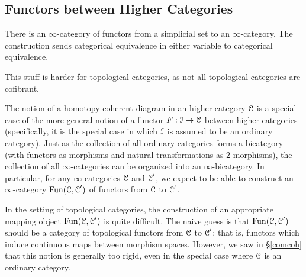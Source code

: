 \subsection{Functors between Higher Categories}\label{funcback}
\begin{1.2.7 Functors between higher cats}
\begin{shaded}
There is an $\infty$-category of functors from a simplicial set to an $\infty$-category. The construction sends categorical equivalence in either variable to categorical equivalence.

This stuff is harder for topological categories, as not all topological categories are cofibrant.
\end{shaded}
The notion of a homotopy coherent diagram in an higher category
$\operatorname{\mathcal{C}}$ is a special case of the more general notion of a functor
$F: \operatorname{\mathcal{I}} \rightarrow \operatorname{\mathcal{C}}$ between higher categories
(specifically, it is the special case in which $\operatorname{\mathcal{I}}$ is assumed
to be an ordinary category). Just as the collection of all
ordinary categories forms a bicategory (with functors as
morphisms and natural transformations as $2$-morphisms), the
collection of all $\infty$-categories can
be organized into an $\infty$-bicategory. In particular, for any
$\infty$-categories $\operatorname{\mathcal{C}}$ and $\operatorname{\mathcal{C}}'$, we expect to be able to construct
an $\infty$-category $\operatorname{Fun}(\operatorname{\mathcal{C}},\operatorname{\mathcal{C}}')$ of functors from $\operatorname{\mathcal{C}}$ to
$\operatorname{\mathcal{C}}'$.

In the setting of topological categories, the construction of an appropriate mapping object $\operatorname{Fun}(\operatorname{\mathcal{C}}, \operatorname{\mathcal{C}}')$ is quite difficult. The naive guess is that $\operatorname{Fun}(\operatorname{\mathcal{C}}, \operatorname{\mathcal{C}}')$ should be 
a category of topological functors from $\operatorname{\mathcal{C}}$ to $\operatorname{\mathcal{C}}'$: that is, functors which induce continuous maps between morphism spaces. However, we saw in \S \ref{comcoh} that this notion is generally too rigid, even in the special case where $\operatorname{\mathcal{C}}$ is an ordinary category.


\end{1.2.7 Functors between higher cats}
